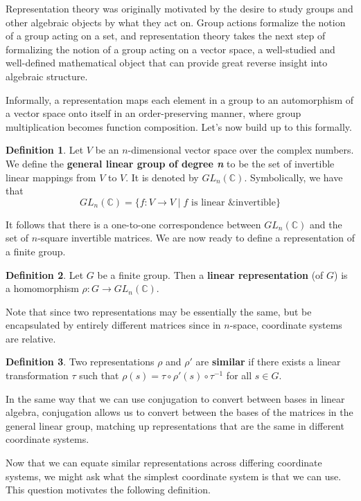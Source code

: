 \documentclass[openany, amssymb, psamsfonts]{amsart}
\theoremstyle{definition}
\newtheorem{defn}{Definition}[section]
\numberwithin{equation}{section}
\begin{document}
Representation theory was originally motivated by the desire to study groups and other algebraic objects by what they act on. Group actions formalize the notion of a group acting on a set, and representation theory takes the next step of formalizing the notion of a group acting on a vector space, a well-studied and well-defined mathematical object that can provide great reverse insight into algebraic structure.\par
Informally, a representation maps each element in a group to an automorphism of a vector space onto itself in an order-preserving manner, where group multiplication becomes function composition. Let's now build up to this formally.
\begin{defn}
    Let $V$ be an $n$-dimensional vector space over the complex numbers. We define the \textbf{general linear group of degree \emph{n}} to be the set of invertible linear mappings from $V$ to $V$. It is denoted by $GL_n(\mathbb{C})$. Symbolically, we have that
    \begin{equation*}
        GL_n(\mathbb{C}) = \{f:V\to V\mid f\text{ is linear \& invertible}\}
    \end{equation*}
\end{defn}
It follows that there is a one-to-one correspondence between $GL_n(\mathbb{C})$ and the set of $n$-square invertible matrices. We are now ready to define a representation of a finite group.
\begin{defn}
    Let $G$ be a finite group. Then a \textbf{linear representation} (of $G$) is a homomorphism $\rho:G\to GL_n(\mathbb{C})$.
\end{defn}
Note that since two representations may be essentially the same, but be encapsulated by entirely different matrices since in $n$-space, coordinate systems are relative.
\begin{defn}
    Two representations $\rho$ and $\rho'$ are \textbf{similar} if there exists a linear transformation $\tau$ such that $\rho(s)=\tau\circ\rho'(s)\circ\tau^{-1}$ for all $s\in G$.
\end{defn}
In the same way that we can use conjugation to convert between bases in linear algebra, conjugation allows us to convert between the bases of the matrices in the general linear group, matching up representations that are the same in different coordinate systems.\par
Now that we can equate similar representations across differing coordinate systems, we might ask what the simplest coordinate system is that we can use. This question motivates the following definition.
\end{document}
